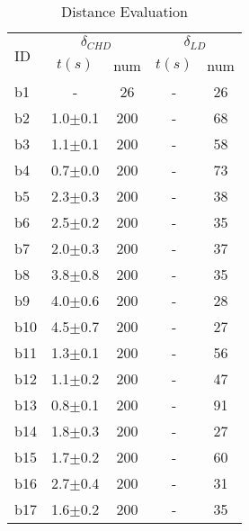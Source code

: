 \begin{longtable}{|l|c|c|c|c|}
\caption{\label{tab:distances}{Distance Evaluation}}\\
\hline
\multirow{2}{*}{ID}&\multicolumn{2}{c|}{$\delta_{CHD}$}&\multicolumn{2}{c|}{$\delta_{LD}$}\\
\cline{2-5}
&$t(s)$&num&$t(s)$&num\\
\hline
b1&- & 26&- & 26
\\
b2&1.0$\pm$0.1 & 200 &- & 68
\\
b3&1.1$\pm$0.1 & 200 &- & 58
\\
b4&0.7$\pm$0.0 & 200 &- & 73
\\
b5&2.3$\pm$0.3 & 200 &- & 38
\\
b6&2.5$\pm$0.2 & 200 &- & 35
\\
b7&2.0$\pm$0.3 & 200 &- & 37
\\
b8&3.8$\pm$0.8 & 200 &- & 35
\\
b9&4.0$\pm$0.6 & 200 &- & 28
\\
b10&4.5$\pm$0.7 & 200 &- & 27
\\
b11&1.3$\pm$0.1 & 200 &- & 56
\\
b12&1.1$\pm$0.2 & 200 &- & 47
\\
b13&0.8$\pm$0.1 & 200 &- & 91
\\
b14&1.8$\pm$0.3 & 200 &- & 27
\\
b15&1.7$\pm$0.2 & 200 &- & 60
\\
b16&2.7$\pm$0.4 & 200 &- & 31
\\
b17&1.6$\pm$0.2 & 200 &- & 35
\\
\hline
\end{longtable}
